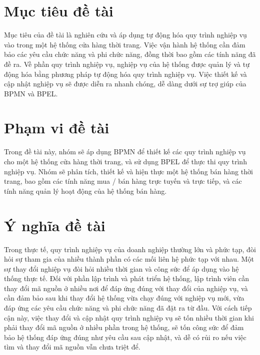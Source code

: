 \section{Mục tiêu đề tài}
\hspace{0.5cm}Mục tiêu của đề tài là nghiên cứu và áp dụng tự động hóa quy trình nghiệp vụ vào trong một hệ thống cửa hàng thời trang. Việc vận hành hệ thống cần đảm bảo các yêu cầu chức năng và phi chức năng, đồng thời bao gồm các tính năng đã đề ra. Về phần quy trình nghiệp vụ, nghiệp vụ của hệ thống được quản lý và tự động hóa bằng phương pháp tự động hóa quy trình nghiệp vụ. Việc thiết kế và cập nhật nghiệp vụ sẽ được diễn ra nhanh chóng, dễ dàng dưới sự trợ giúp của BPMN và BPEL. 

\section{Phạm vi đề tài}
\hspace{0.5cm}Trong đề tài này, nhóm sẽ áp dụng BPMN để thiết kế các quy trình nghiệp vụ cho một hệ thống cửa hàng thời trang, và sử dụng BPEL để thực thi quy trình nghiệp vụ. Nhóm sẽ phân tích, thiết kế và hiện thực một hệ thống bán hàng thời trang, bao gồm các tính năng mua / bán hàng trực tuyến và trực tiếp, và các tính năng quản lý hoạt động của hệ thống bán hàng. 

\section{Ý nghĩa đề tài}
\hspace{0.5cm} Trong thực tế, quy trình nghiệp vụ của doanh nghiệp thường lớn và phức tạp, đòi hỏi sự tham gia của nhiều thành phần có các mối liên hệ phức tạp với nhau. Một sự thay đổi nghiệp vụ đòi hỏi nhiều thời gian và công sức để áp dụng vào hệ thống thực tế. Đối với phần lập trình và phát triển hệ thống, lập trình viên cần thay đổi mã nguồn ở nhiều nơi để đáp ứng đúng với thay đổi của nghiệp vụ, và cần đảm bảo sau khi thay đổi hệ thống vừa chạy đúng với nghiệp vụ mới, vừa đáp ứng các yêu cầu chức năng và phi chức năng đã đặt ra từ đầu. Với cách tiếp cận này, việc thay đổi và cập nhật quy trình nghiệp vụ sẽ tốn nhiều thời gian khi phải thay đổi mã nguồn ở nhiều phần trong hệ thống, sẽ tốn công sức để đảm bảo hệ thống đáp ứng đúng như yêu cầu sau cập nhật, và dễ có rủi ro nếu việc tìm và thay đổi mã nguồn vẫn chưa triệt để.\\

